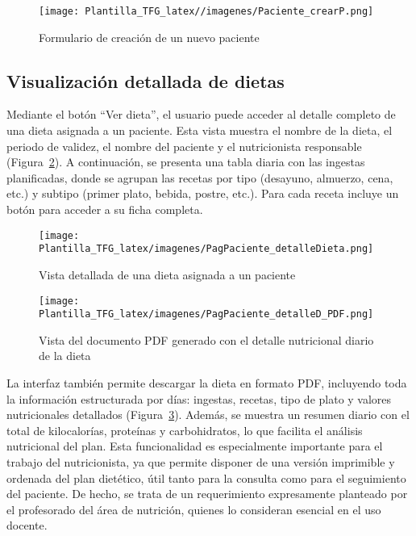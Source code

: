 \begin{figure}[H]
    \centering
    \texttt{[image: Plantilla\_TFG\_latex//imagenes/Paciente\_crearP.png]}
    \caption{Formulario de creación de un nuevo paciente}
    \label{fig:Paciente_crearP}
\end{figure}

\subsection{Visualización detallada de dietas}
Mediante el botón ``Ver dieta'', el usuario puede acceder al detalle completo de una dieta asignada a un paciente. Esta vista muestra el nombre de la dieta, el periodo de validez, el nombre del paciente y el nutricionista responsable (Figura~\ref{fig:detalle_dieta_visual}). A continuación, se presenta una tabla diaria con las ingestas planificadas, donde se agrupan las recetas por tipo (desayuno, almuerzo, cena, etc.) y subtipo (primer plato, bebida, postre, etc.). Para cada receta incluye un botón para acceder a su ficha completa. 
\begin{figure}
    \centering
    \texttt{[image: Plantilla\_TFG\_latex/imagenes/PagPaciente\_detalleDieta.png]}
    \caption{Vista detallada de una dieta asignada a un paciente}
    \label{fig:detalle_dieta_visual}
\end{figure}

\begin{figure}
    \centering
    \texttt{[image: Plantilla\_TFG\_latex/imagenes/PagPaciente\_detalleD\_PDF.png]}
    \caption{Vista del documento PDF generado con el detalle nutricional diario de la dieta}
    \label{fig:detalle_dieta_pdf}
\end{figure}


La interfaz también permite descargar la dieta en formato PDF, incluyendo toda la información estructurada por días: ingestas, recetas, tipo de plato y valores nutricionales detallados (Figura~\ref{fig:detalle_dieta_pdf}). Además, se muestra un resumen diario con el total de kilocalorías, proteínas y carbohidratos, lo que facilita el análisis nutricional del plan. Esta funcionalidad es especialmente importante para el trabajo del nutricionista, ya que permite disponer de una versión imprimible y ordenada del plan dietético, útil tanto para la consulta como para el seguimiento del paciente. De hecho, se trata de un requerimiento expresamente planteado por el profesorado del área de nutrición, quienes lo consideran esencial en el uso docente.


